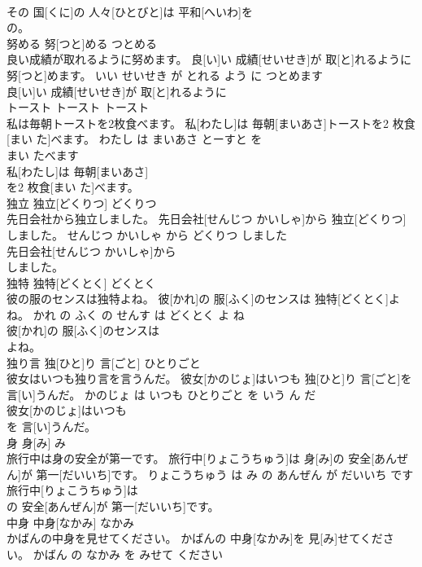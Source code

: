 \documentclass[8pt]{extreport}
\begin{document}
\begin{CJK}{UTF8}{min}
\\	その 国[くに]の 人々[ひとびと]は 平和[へいわ]を
\\	の。			
\\	努める	努[つと]める	つとめる	
\\	良い成績が取れるように努めます。	良[い]い 成績[せいせき]が 取[と]れるように 努[つと]めます。	いい せいせき が とれる よう に つとめます	
\\	良[い]い 成績[せいせき]が 取[と]れるように
\\	トースト	トースト	トースト	
\\	私は毎朝トーストを2枚食べます。	私[わたし]は 毎朝[まいあさ]トーストを2 枚食[まい た]べます。	わたし は まいあさ とーすと を 
\\	まい たべます	
\\	私[わたし]は 毎朝[まいあさ]
\\	を2 枚食[まい た]べます。			
\\	独立	独立[どくりつ]	どくりつ	
\\	先日会社から独立しました。	先日会社[せんじつ かいしゃ]から 独立[どくりつ]しました。	せんじつ かいしゃ から どくりつ しました	
\\	先日会社[せんじつ かいしゃ]から
\\	しました。			
\\	独特	独特[どくとく]	どくとく	
\\	彼の服のセンスは独特よね。	彼[かれ]の 服[ふく]のセンスは 独特[どくとく]よね。	かれ の ふく の せんす は どくとく よ ね	
\\	彼[かれ]の 服[ふく]のセンスは
\\	よね。			
\\	独り言	独[ひと]り 言[ごと]	ひとりごと	
\\	彼女はいつも独り言を言うんだ。	彼女[かのじょ]はいつも 独[ひと]り 言[ごと]を 言[い]うんだ。	かのじょ は いつも ひとりごと を いう ん だ	
\\	彼女[かのじょ]はいつも
\\	を 言[い]うんだ。			
\\	身	身[み]	み	
\\	旅行中は身の安全が第一です。	旅行中[りょこうちゅう]は 身[み]の 安全[あんぜん]が 第一[だいいち]です。	りょこうちゅう は み の あんぜん が だいいち です	
\\	旅行中[りょこうちゅう]は
\\	の 安全[あんぜん]が 第一[だいいち]です。			
\\	中身	中身[なかみ]	なかみ	
\\	かばんの中身を見せてください。	かばんの 中身[なかみ]を 見[み]せてください。	かばん の なかみ を みせて ください	

\end{CJK}
\end{document}
